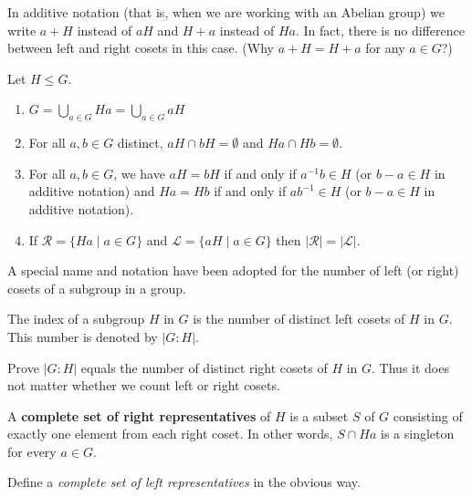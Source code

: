 \documentclass[11pt,a4paper]{article}
\begin{document}
\begin{rem}
    In additive notation (that is, when we are working with an Abelian group) we write \(a+H\) instead of \(aH\) and \(H+a\) instead of \(Ha\).
    In fact, there is no difference between left and right cosets in this case. (Why \(a+ H = H + a\) for any \(a\in G\)?)
\end{rem}
 



\begin{cor}
Let \(H\leq G\).
\begin{enumerate}[label=(\roman*)]
    \item      \( G = \bigcup\limits_{a \in G} Ha = \bigcup\limits_{a \in G} aH \)
    \item For all \(a,b\in G\) distinct, \( aH \cap bH = \emptyset \) and \( Ha \cap Hb = \emptyset \).
    \item For all \(a,b\in G\), we have \( aH = bH \) if and only if \( a^{-1}b \in H \) (or \( b-a \in H \) in additive notation)  and \( Ha = Hb \) if and only if \( ab^{-1} \in H \) (or \( b-a  \in H \) in additive notation).
    \item If \( \mathcal{R} = \{ Ha \mid a \in G \} \) and \( \mathcal{L} = \{ aH \mid a \in G \} \) then \(|\mathcal{R}|=|\mathcal{L}|\).
\end{enumerate}
 
\end{cor}

A special name and notation have been adopted for the number of left (or right) cosets of a subgroup in a group.

\begin{defi}[Index]
    The index of a subgroup $H$ in $G$ is the number of distinct left cosets of $H$ in $G$. This number is denoted by $|G: H|$. 
\end{defi}

\begin{eje}
    Prove $|G: H|$ equals the number of distinct right cosets of $H$ in $G$.
    Thus it does not matter whether we count left or right cosets.
\end{eje}


\begin{defi}
    A \textbf{complete set of right representatives} of \(H\) is a subset \(S\) of \(G\) consisting of exactly one element from each right coset. In other words, 
    \(S\cap Ha \) is a singleton for every \(a\in G\).
\end{defi}

Define a \textit{complete set of left representatives} in the obvious way.
\end{document}
